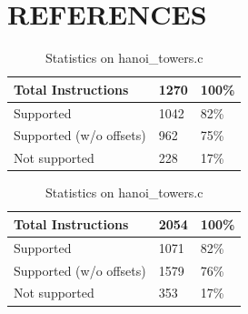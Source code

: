 \documentclass[10pt,twocolumn]{article}
\begin{document}
\section{REFERENCES}
\begingroup
\renewcommand{\section}[2]{}


\endgroup

\appendix
\clearpage
\section*{Appendix}
\begin{table}[!ht]
  \centering
  
  \medskip

  \begin{tabular}{l|l|l}
    \textbf{Total Instructions} & \textbf{1270} & \textbf{100\%} \\ \hline
    Supported                   & 1042          & 82\%           \\ \hline
    Supported (w/o offsets)     & 962           & 75\%           \\ \hline
    Not supported               & 228           & 17\%          
  \end{tabular}%
  \label{result-fibo}
  \caption{Statistics on fibonacci.c}

  \bigskip

  
  \medskip

  \begin{tabular}{l|l|l}
    \textbf{Total Instructions} & \textbf{2054} & \textbf{100\%} \\ \hline
    Supported                   & 1071          & 82\%           \\ \hline
    Supported (w/o offsets)     & 1579          & 76\%           \\ \hline
    Not supported               & 353           & 17\%          
  \end{tabular}%
  \label{result-hanoi}
  \caption{Statistics on hanoi\_towers.c}
\end{table}
\end{document}
